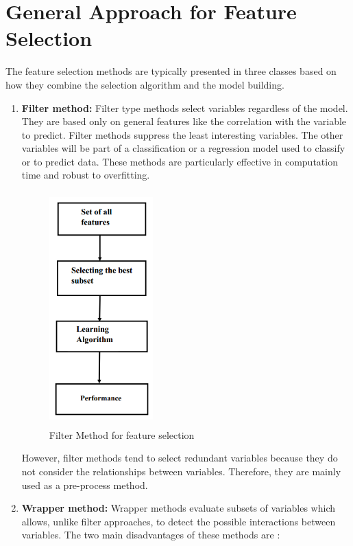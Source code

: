 \documentclass[document.tex]{subfiles}
\begin{document}
\section{General Approach for Feature Selection}
\noindent The feature selection methods are typically presented in three classes based on how they combine the selection algorithm and the model building.
\begin{enumerate}
	\item \textbf{Filter method: }Filter type methods select variables regardless of the model. They are based only on general features like the correlation with the variable to predict. Filter methods suppress the least interesting variables. The other variables will be part of a classification or a regression model used to classify or to predict data. These methods are particularly effective in computation time and robust to overfitting.
	\begin{figure}[H]
		\begin{center}
			\includegraphics[height=9.0cm,width=4cm]{imgs/filterMethod.png}
		\end{center}
		\caption{Filter Method for feature selection}
		\label{fig:Filter Method for feature selection}
	\end{figure}
	However, filter methods tend to select redundant variables because they do not consider the relationships between variables. Therefore, they are mainly used as a pre-process method.
	\item \textbf{Wrapper method:} Wrapper methods evaluate subsets of variables which allows, unlike filter approaches, to detect the possible interactions between variables. The two main disadvantages of these methods are :
	\begin{itemize}

\end{itemize}
\end{enumerate}
\end{document}
